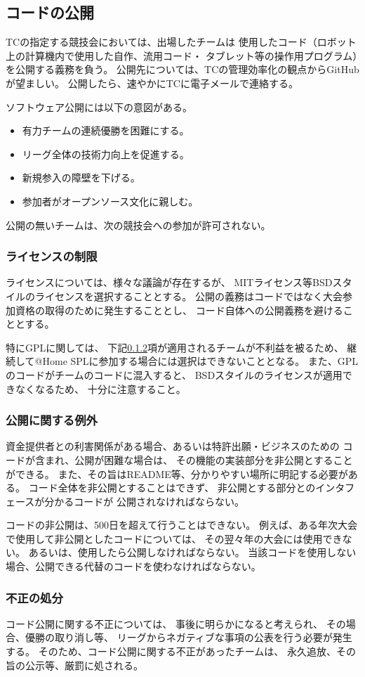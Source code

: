 \documentclass[a4j]{jarticle}
\begin{document}
\subsection{コードの公開}

TCの指定する競技会においては、出場したチームは
使用したコード（ロボット上の計算機内で使用した自作、流用コード・
タブレット等の操作用プログラム）を公開する義務を負う。
公開先については、TCの管理効率化の観点からGitHubが望ましい。
公開したら、速やかにTCに電子メールで連絡する。


ソフトウェア公開には以下の意図がある。
\begin{itemize}
	\item 有力チームの連続優勝を困難にする。
	\item リーグ全体の技術力向上を促進する。
	\item 新規参入の障壁を下げる。
	\item 参加者がオープンソース文化に親しむ。
\end{itemize}
公開の無いチームは、次の競技会への参加が許可されない。

\subsubsection{ライセンスの制限}

ライセンスについては、様々な議論が存在するが、
MITライセンス等BSDスタイルのライセンスを選択することとする。
公開の義務はコードではなく大会参加資格の取得のために発生することとし、
コード自体への公開義務を避けることとする。

特にGPLに関しては、
下記\ref{sub:licence_exception}項が適用されるチームが不利益を被るため、
継続して@Home SPLに参加する場合には選択はできないこととなる。
また、GPLのコードがチームのコードに混入すると、
BSDスタイルのライセンスが適用できなくなるため、
十分に注意すること。

\subsubsection{公開に関する例外}\label{sub:licence_exception}

資金提供者との利害関係がある場合、あるいは特許出願・ビジネスのための
コードが含まれ、公開が困難な場合は、
その機能の実装部分を非公開とすることができる。
また、その旨はREADME等、分かりやすい場所に明記する必要がある。
コード全体を非公開とすることはできず、
非公開とする部分とのインタフェースが分かるコードが
公開されなければならない。


コードの非公開は、500日を超えて行うことはできない。
例えば、ある年次大会で使用して非公開としたコードについては、
その翌々年の大会には使用できない。
あるいは、使用したら公開しなければならない。
当該コードを使用しない場合、公開できる代替のコードを使わなければならない。

\subsubsection{不正の処分}


コード公開に関する不正については、
事後に明らかになると考えられ、
その場合、優勝の取り消し等、
リーグからネガティブな事項の公表を行う必要が発生する。
そのため、コード公開に関する不正があったチームは、
永久追放、その旨の公示等、厳罰に処される。

%
\end{document}
